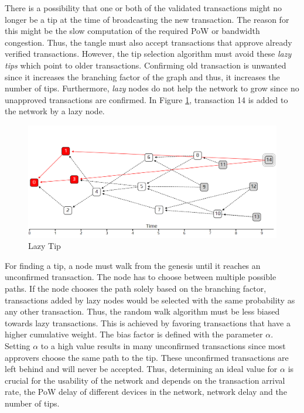 There is a possibility that one or both of the validated transactions might no longer be a tip at the time of broadcasting the new transaction. The reason for this might be the slow computation of the required PoW or bandwidth congestion. Thus, the tangle must also accept transactions that approve already verified transactions. However, the tip selection algorithm must avoid these \textit{lazy tips} which point to older transactions. Confirming old transaction is unwanted since it increases the branching factor of the graph and thus, it increases the number of tips. Furthermore, \textit{lazy} nodes do not help the network to grow since no unapproved transactions are confirmed. In Figure \ref{fig:lazy-tip}, transaction 14 is added to the network by a lazy node. 


\begin{figure}[H]
    \centering
    \includegraphics[width=1.0\textwidth]{images/lazy-tip.png}
    \caption{Lazy Tip \cite{the-tangle-part-3}}
    \label{fig:lazy-tip}
\end{figure}

For finding a tip, a node must walk from the genesis until it reaches an unconfirmed transaction. The node has to choose between multiple possible paths. If the node chooses the path solely based on the branching factor, transactions added by lazy nodes would be selected with the same probability as any other transaction. Thus, the random walk algorithm must be less biased towards lazy transactions. 
This is achieved by favoring transactions that have a higher cumulative weight. The bias factor is defined with the parameter $\alpha$. Setting $\alpha$ to a high value results in many unconfirmed transactions since most approvers choose the same path to the tip. These unconfirmed transactions are left behind and will never be accepted. Thus, determining an ideal value for $\alpha$ is crucial for the usability of the network and depends on the transaction arrival rate, the PoW delay of different devices in the network, network delay and the number of tips. 

